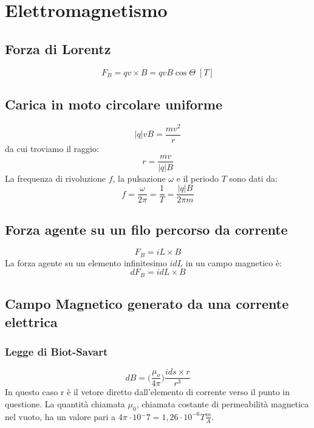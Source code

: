 \chapter*{Elettromagnetismo}

    \section*{Forza di Lorentz}
        \begin{equation*}
            F_B = qv \times B = qvB\cos\Theta \; [T]
        \end{equation*}

    \section*{Carica in moto circolare uniforme}
        \begin{equation*}
            |q|vB = \frac{mv^2}{r}
        \end{equation*}
    da cui troviamo il raggio:
        \begin{equation*}
            r = \frac{mv}{|q|B}
        \end{equation*}
    La frequenza di rivoluzione $f$, la pulsazione $\omega$ e il periodo $T$
    sono dati da:
        \begin{equation*}
            f = \frac{\omega}{2\pi} = \frac{1}{T} = \frac{|q|B}{2\pi m}
        \end{equation*}

    \section*{Forza agente su un filo percorso da corrente}
        \begin{equation*}
            F_B = iL\times B
        \end{equation*}
    La forza agente su un elemento infinitesimo $idL$ in un campo magnetico è:
        \begin{equation*}
            dF_B = idL\times B
        \end{equation*}

    \section*{Campo Magnetico generato da una corrente elettrica}

        \subsection*{Legge di Biot-Savart}
            \begin{equation*}
                dB = \Bigg(\frac{\mu_o}{4\pi}\Bigg)\frac{ids\times r}{r^3}
            \end{equation*}
        In questo caso r è il vetore diretto dall'elemento di corrente verso il
        punto in questione. La quantità chiamata $\mu_0$, chiamata costante di 
        permeabilità magnetica nel vuoto, ha un valore pari a $4\pi \cdot 
        10{^-7} = 1,26 \cdot 10^{-6} T \frac{m}{A}$.

